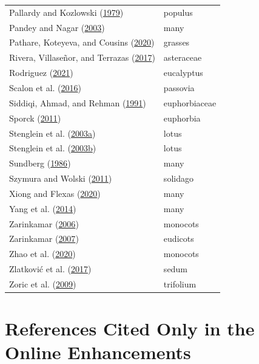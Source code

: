 \documentclass[
  12pt,
]{article}
\begin{document}
\begin{longtable}[]{@{}ll@{}}
Pallardy and Kozlowski (\protect\hyperlink{ref-pallardy_frequency_1979}{1979}) & populus \\
Pandey and Nagar (\protect\hyperlink{ref-pandey_patterns_2003}{2003}) & many \\
Pathare, Koteyeva, and Cousins (\protect\hyperlink{ref-pathare_increased_2020}{2020}) & grasses \\
Rivera, Villaseñor, and Terrazas (\protect\hyperlink{ref-rivera_meso-_2017}{2017}) & asteraceae \\
Rodriguez (\protect\hyperlink{ref-rodriguez_unpublished_2021}{2021}) & eucalyptus \\
Scalon et al. (\protect\hyperlink{ref-scalon_leaf_2016}{2016}) & passovia \\
Siddiqi, Ahmad, and Rehman (\protect\hyperlink{ref-siddiqi_contribution_1991}{1991}) & euphorbiaceae \\
Sporck (\protect\hyperlink{ref-sporck_hawaiian_2011}{2011}) & euphorbia \\
Stenglein et al. (\protect\hyperlink{ref-stenglein_leaf_2003}{2003a}) & lotus \\
Stenglein et al. (\protect\hyperlink{ref-stenglein_leaf_2003-1}{2003b}) & lotus \\
Sundberg (\protect\hyperlink{ref-sundberg_comparison_1986}{1986}) & many \\
Szymura and Wolski (\protect\hyperlink{ref-szymura_leaf_2011}{2011}) & solidago \\
Xiong and Flexas (\protect\hyperlink{ref-xiong_one_2020}{2020}) & many \\
Yang et al. (\protect\hyperlink{ref-yang_large-scale_2014}{2014}) & many \\
Zarinkamar (\protect\hyperlink{ref-zarinkamar_density_2006}{2006}) & monocots \\
Zarinkamar (\protect\hyperlink{ref-zarinkamar_stomatal_2007}{2007}) & eudicots \\
Zhao et al. (\protect\hyperlink{ref-zhao_difference_2020}{2020}) & monocots \\
Zlatković et al. (\protect\hyperlink{ref-zlatkovic_epidermal_2017}{2017}) & sedum \\
Zoric et al. (\protect\hyperlink{ref-zoric_leaf_2009}{2009}) & trifolium \\
\bottomrule()
\end{longtable}

\clearpage

\hypertarget{references-cited-only-in-the-online-enhancements}{%
\section*{References Cited Only in the Online Enhancements}\label{references-cited-only-in-the-online-enhancements}}
\end{document}
